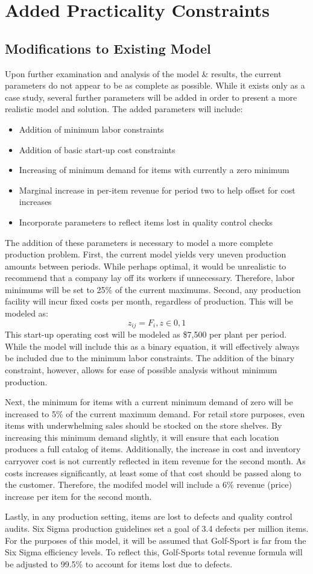 \documentclass{article}
\begin{document}
\section{Added Practicality Constraints}
\subsection{Modifications to Existing Model}
Upon further examination and analysis of the model \& results, the current parameters do not appear to be as complete as possible.  While it exists only as a case study, several further parameters will be added in order to present a more realistic model and solution.  The added parameters will include:
\begin{itemize}
	\item Addition of minimum labor constraints
	\item Addition of basic start-up cost constraints
	\item Increasing of minimum demand for items with currently a zero minimum
	\item Marginal increase in per-item revenue for period two to help offset for cost increases
	\item Incorporate parameters to reflect items lost in quality control checks
\end{itemize}
The addition of these parameters is necessary to model a more complete production problem.  First, the current model yields very uneven production amounts between periods.  While perhaps optimal, it would be unrealistic to recommend that a company lay off its workers if unnecessary.  Therefore, labor minimums will be set to 25\% of the current maximums.  Second, 
any production facility will incur fixed costs per month, regardless of production.  This will be modeled as:
$$ z_{ij} = F_{i}, z\in {0,1} $$
This start-up operating cost will be modeled as \$7,500 per plant per period.  While the model will include this as a binary equation, it will effectively always be included due to the minimum labor constraints.  The addition of the binary constraint, however, allows for ease of possible analysis without minimum production.
\par
Next, the minimum for items with a current minimum demand of zero will be increased to 5\% of the current maximum demand.  For retail store purposes, even items with underwhelming sales should be stocked on the store shelves.  By increasing this minimum demand slightly, it will ensure that each location produces a full catalog of items.  
Additionally, the increase in cost and inventory carryover cost is not currently reflected in item revenue for the second month.  As costs increases significantly, at least some of that cost should be passed along to the customer.  Therefore, the modifed model will include a 6\% revenue (price) increase per item for the second month.
\par
Lastly, in any production setting, items are lost to defects and quality control audits.  Six Sigma production guidelines set a goal of 3.4 defects per million items.  For the purposes of this model, it will be assumed that Golf-Sport is far from the Six Sigma efficiency levels.  To reflect this, Golf-Sports total revenue formula will be adjusted to 99.5\% to account for items lost due to defects.
\end{document}
